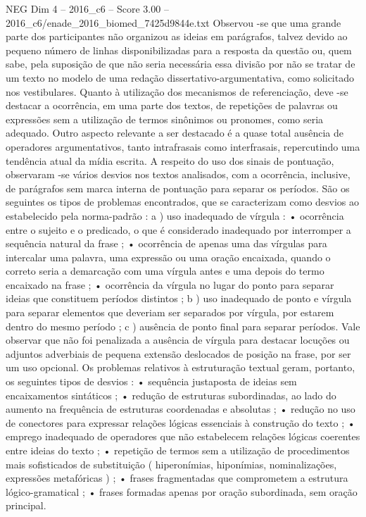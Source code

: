 \begin{textsample}{NEG Dim 4 – 2016\_c6 – Score 3.00 – 2016\_c6/enade\_2016\_biomed\_7425d9844e.txt}
Observou -se que uma grande parte dos participantes não organizou as ideias em parágrafos, talvez devido ao pequeno número de linhas disponibilizadas para a resposta da questão ou, quem sabe, pela suposição de que não seria necessária essa divisão por não se tratar de um texto no modelo de uma redação dissertativo-argumentativa, como solicitado nos vestibulares.
Quanto à utilização dos mecanismos de referenciação, deve -se destacar a ocorrência, em uma parte dos textos, de repetições de palavras ou expressões sem a utilização de termos sinônimos ou pronomes, como seria adequado.
Outro aspecto relevante a ser destacado é a quase total ausência de operadores argumentativos, tanto intrafrasais como interfrasais, repercutindo uma tendência atual da mídia escrita.
A respeito do uso dos sinais de pontuação, observaram -se vários desvios nos textos analisados, com a ocorrência, inclusive, de parágrafos sem marca interna de pontuação para separar os períodos.
São os seguintes os tipos de problemas encontrados, que se caracterizam como desvios ao estabelecido pela norma-padrão : a ) uso inadequado de vírgula : • ocorrência entre o sujeito e o predicado, o que é considerado inadequado por interromper a sequência natural da frase ; • ocorrência de apenas uma das vírgulas para intercalar uma palavra, uma expressão ou uma oração encaixada, quando o correto seria a demarcação com uma vírgula antes e uma depois do termo encaixado na frase ; • ocorrência da vírgula no lugar do ponto para separar ideias que constituem períodos distintos ; b ) uso inadequado de ponto e vírgula para separar elementos que deveriam ser separados por vírgula, por estarem dentro do mesmo período ; c ) ausência de ponto final para separar períodos.
Vale observar que não foi penalizada a ausência de vírgula para destacar locuções ou adjuntos adverbiais de pequena extensão deslocados de posição na frase, por ser um uso opcional.
Os problemas relativos à estruturação textual geram, portanto, os seguintes tipos de desvios : • sequência justaposta de ideias sem encaixamentos sintáticos ; • redução de estruturas subordinadas, ao lado do aumento na frequência de estruturas coordenadas e absolutas ; • redução no uso de conectores para expressar relações lógicas essenciais à construção do texto ; • emprego inadequado de operadores que não estabelecem relações lógicas coerentes entre ideias do texto ; • repetição de termos sem a utilização de procedimentos mais sofisticados de substituição ( hiperonímias, hiponímias, nominalizações, expressões metafóricas ) ; • frases fragmentadas que comprometem a estrutura lógico-gramatical ; • frases formadas apenas por oração subordinada, sem oração principal.

\end{textsample}
